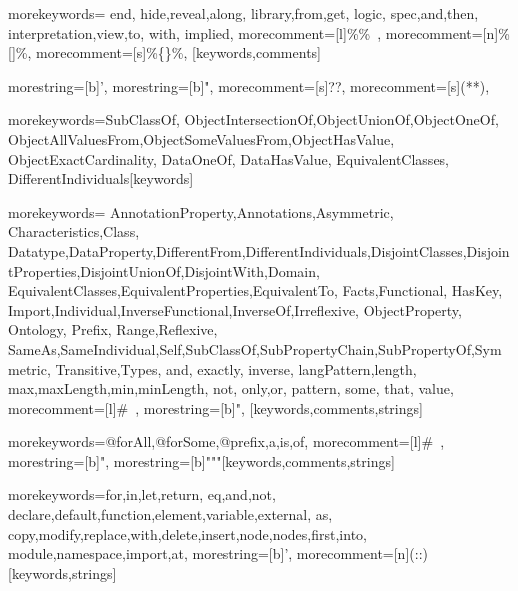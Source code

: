 %
{morekeywords={%
end,%
hide,reveal,along,%
library,from,get,%
logic,%
spec,and,then,%
interpretation,view,to,%
with,%
implied},
morecomment=[l]{\%\%\ },%
morecomment=[n]{\%[}{]\%},%
morecomment=[s]{\%\{}{\}\%},%
}[keywords,comments]

%
{morestring=[b]',%
morestring=[b]",%
morecomment=[s]{?}{?},%
morecomment=[s]{(*}{*)},%
}

%
{morekeywords={SubClassOf,%
ObjectIntersectionOf,ObjectUnionOf,ObjectOneOf,%
ObjectAllValuesFrom,ObjectSomeValuesFrom,ObjectHasValue,%
ObjectExactCardinality,%
DataOneOf,%
DataHasValue,%
EquivalentClasses,%
DifferentIndividuals}}[keywords]

%
{morekeywords={%
AnnotationProperty,Annotations,Asymmetric,%
Characteristics,Class,%
Datatype,DataProperty,DifferentFrom,DifferentIndividuals,DisjointClasses,DisjointProperties,DisjointUnionOf,DisjointWith,Domain,%
EquivalentClasses,EquivalentProperties,EquivalentTo,%
Facts,Functional,%
HasKey,%
Import,Individual,InverseFunctional,InverseOf,Irreflexive,%
ObjectProperty,%
Ontology,%
Prefix,%
Range,Reflexive,%
SameAs,SameIndividual,Self,SubClassOf,SubPropertyChain,SubPropertyOf,Symmetric,%
Transitive,Types,%
and,%
exactly,%
inverse,%
langPattern,length,%
max,maxLength,min,minLength,%
not,%
only,or,%
pattern,%
some,%
that,%
value},%
morecomment=[l]{\#\ },%
morestring=[b]",%
}[keywords,comments,strings]

%
{morekeywords={@forAll,@forSome,@prefix,a,is,of},%
morecomment=[l]{\#\ },%
morestring=[b]",%
morestring=[b]{"""}}[keywords,comments,strings]

%
{morekeywords={for,in,let,return,%
eq,and,not,%
declare,default,function,element,variable,external,%
as,%
copy,modify,replace,with,delete,insert,node,nodes,first,into,%
module,namespace,import,at},%
 morestring=[b]',%
 morecomment=[n]{(:}{:)}}[keywords,strings]

